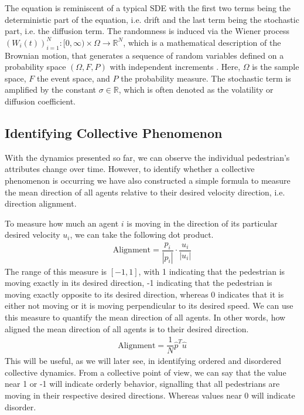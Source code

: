 The equation is reminiscent of a typical SDE with the first two terms being the deterministic part of the equation, i.e. drift and the last term being the stochastic part, i.e. the diffusion term. The randomness is induced via the Wiener process $(W_i(t))^N_{i=1}: [0,\infty) \times \Omega \rightarrow \mathbb{R}^N$, which is a mathematical description of the Brownian motion, that generates a sequence of random variables defined on a probability space $(\Omega, F, P)$ with independent increments \cite{oksendal2003stochastic}. Here, $\Omega$ is the sample space, $F$ the event space, and $P$ the probability measure. The stochastic term is amplified by the constant $\sigma \in \mathbb{R}$, which is often denoted as the volatility or diffusion coefficient.


\subsection{Identifying Collective Phenomenon}
With the dynamics presented so far, we can observe the individual pedestrian's attributes change over time. However, to identify whether a collective phenomenon is occurring we have also constructed a simple formula to measure the mean direction of all agents relative to their desired velocity direction, i.e. direction alignment.

To measure how much an agent $i$ is moving in the direction of its particular desired velocity $u_i$, we can take the following dot product.
\begin{gather}
    \text{Alignment} = \dfrac{p_i}{|p_i|} \cdot \dfrac{u_i}{|u_i|}
\end{gather}
The range of this measure is $[-1, 1]$, with 1 indicating that the pedestrian is moving exactly in its desired direction, -1 indicating that the pedestrian is moving exactly opposite to its desired direction, whereas 0 indicates that it is either not moving or it is moving perpendicular to its desired speed. We can use this measure to quantify the mean direction of all agents. In other words, how aligned the mean direction of all agents is to their desired direction.
\begin{gather}
    \text{Alignment} = \dfrac{1}{N}\hat p^T \hat u
    \label{eq:alignment}
\end{gather}
This will be useful, as we will later see, in identifying ordered and disordered collective dynamics. From a collective point of view, we can say that the value near 1 or -1 will indicate orderly behavior, signalling that all pedestrians are moving in their respective desired directions. Whereas values near 0 will indicate disorder.
\pagebreak

